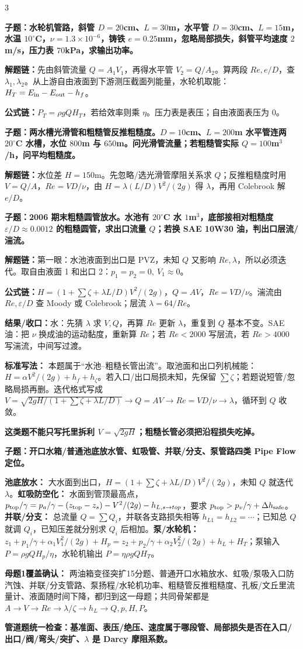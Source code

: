 \documentclass[a4paper]{article}
\newcommand{\qt}[1]{\vspace{0.04pt}\colorbox{Q}{\parbox{\dimexpr\linewidth-2\fboxsep}{\color{white}\bfseries #1}}\par}
\newcommand{\ans}[1]{\colorbox{G}{\parbox{\dimexpr\linewidth-2\fboxsep}{#1}}\par}
\newcommand{\warn}[1]{\colorbox{Y}{\parbox{\dimexpr\linewidth-2\fboxsep}{\color{E}\bfseries #1}}\par}
\newcommand{\chain}[1]{{\color{A}\bfseries 解题链：}#1\par}
\newcommand{\res}[1]{{\color{E}\bfseries 结果/收口：}#1\par}
\newcommand{\form}[1]{{\color{M}\bfseries 公式链：}#1\par}
\begin{document}
\begin{multicols}{3}
\qt{子题：水轮机管路，斜管 $D=20$cm、$L=30$m，水平管 $D=30$cm、$L=15$m，水温 $10^\circ$C，$\nu=1.3\times10^{-6}$，铸铁 $e=0.25$mm，忽略局部损失，斜管平均速度 $2$m/s，压力表 $70$kPa，求输出功率。}
\chain{先由斜管流量 $Q=A_1V_1$，再得水平管 $V_2=Q/A_2$。算两段 $Re,e/D$，查 $\lambda_1,\lambda_2$。从上游自由液面到下游测压截面列能量，水轮机取能：$H_T=E_{\rm in}-E_{\rm out}-h_f$。}
\form{$P_T=\rho gQH_T$，若给效率则乘 $\eta$。压力表是表压；自由液面表压为 0。}

\qt{子题：两水槽光滑管和粗糙管反推粗糙度。$D=10$cm、$L=200$m 水平管连两 $20^\circ$C 水槽，水位 $800$m 与 $650$m。问光滑管流量；若粗糙管实际 $Q=100$m$^3$/h，问平均粗糙度。}
\chain{水位差 $H=150$m。先忽略/选光滑管摩阻关系求 $Q$；反推粗糙度时用 $V=Q/A$，$Re=VD/\nu$，由 $H=\lambda(L/D)V^2/(2g)$ 得 $\lambda$，再用 Colebrook 解 $e/D$。}

\qt{子题：2006 期末粗糙圆管放水。水池有 $20^\circ$C 水 $1$m$^3$，底部接相对粗糙度 $\varepsilon/D\approx0.0012$ 的粗糙圆管，求出口流量 $Q$；若换 SAE 10W30 油，判出口层流/湍流。}
\chain{第一眼：水池液面到出口是 PVZ，未知 $Q$ 又影响 $Re,\lambda$，所以必须迭代。取自由液面 1 和出口 2：$p_1=p_2=0,\ V_1\approx0$。}
\form{$H=\left(1+\sum\zeta+\lambda L/D\right)V^2/(2g)$，$Q=AV$，$Re=VD/\nu$。湍流由 $Re,\varepsilon/D$ 查 Moody 或 Colebrook；层流 $\lambda=64/Re$。}
\res{水：先猜 $\lambda$ 求 $V,Q$，再算 $Re$ 更新 $\lambda$，重复到 $Q$ 基本不变。SAE 油：把 $\nu$ 换成油的运动黏度，重新算 $Re$；若 $Re<2000$ 写层流，若 $Re>4000$ 写湍流，中间写过渡。}
\ans{\textbf{标准写法：} 本题属于“水池--粗糙长管出流”。取池面和出口列机械能：$H=\alpha V^2/(2g)+h_f+h_\zeta$。若入口/出口局损未知，先保留 $\sum\zeta$；若题说短管/忽略局损再删。迭代格式写成 $V=\sqrt{2gH/(1+\sum\zeta+\lambda L/D)}\to Q=AV\to Re=VD/\nu\to\lambda$，循环到 $Q$ 收敛。}
\warn{这类题不能只写托里拆利 $V=\sqrt{2gH}$；粗糙长管必须把沿程损失吃掉。}

\qt{子题：开口水箱/普通池底放水管、虹吸管、并联/分支、泵管路四类 Pipe Flow 定位。}
\ans{\textbf{池底放水：} 大水面到出口，$H=(1+\sum\zeta+\lambda L/D)V^2/(2g)$，未知 $Q$ 就迭代 $\lambda$。\textbf{虹吸防空化：} 水面到管顶最高点，$p_{\rm top}/\gamma=p_a/\gamma-(z_{\rm top}-z_s)-V^2/(2g)-h_{L,s\to top}$，要求 $p_{\rm top}>p_v/\gamma+\Delta h_{\rm safe}$。\textbf{并联/分支：} 总流量 $Q=\sum Q_i$，并联各支路损失相等 $h_{L1}=h_{L2}=\cdots$；已知总 $Q$ 就调 $Q_i$，已知压差就分别求 $Q_i$ 后相加。\textbf{泵/水轮机：} $z_1+p_1/\gamma+\alpha_1V_1^2/(2g)+H_p=z_2+p_2/\gamma+\alpha_2V_2^2/(2g)+h_L+H_T$；泵输入 $P=\rho gQH_p/\eta$，水轮机输出 $P=\eta\rho gQH_T$。}
\ans{\textbf{母题1覆盖确认：} 两油箱变径突扩15分题、普通开口水箱放水、虹吸/泵吸入口防汽蚀、并联/分支管路、泵扬程/水轮机功率、粗糙管反推粗糙度、孔板/文丘里流量计、液面随时间下降，都归到这一母题；共同骨架都是 $A\to V\to Re\to\lambda/\zeta\to h_L\to Q,p,H,P$。}
\warn{管道题统一检查：基准面、表压/绝压、速度属于哪段管、局部损失是否在入口/出口/阀/弯头/突扩、$\lambda$ 是 Darcy 摩阻系数。}


\end{multicols}
\end{document}
